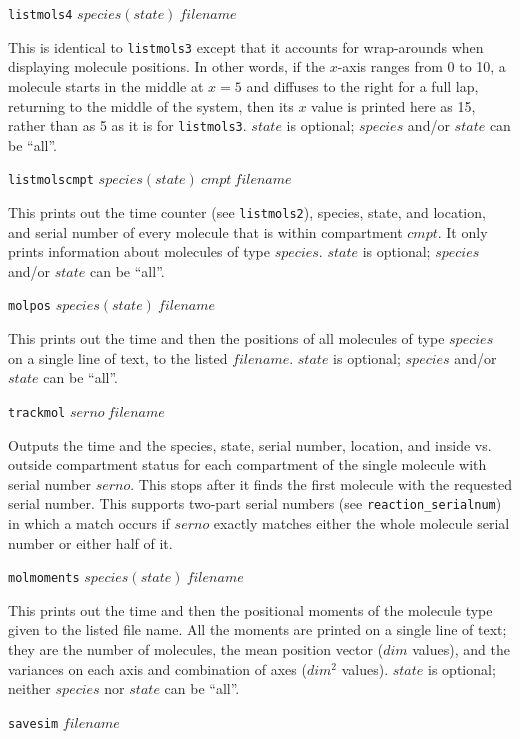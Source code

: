 \documentclass {scrbook}
\newcommand {\ttt} {\texttt}
\begin{document}
\begin{description}
\item{\ttt{listmols4} $species(state)\ filename$}

This is identical to \ttt{listmols3} except that it accounts for wrap-arounds when displaying molecule positions. In other words, if the $x$-axis ranges from 0 to 10, a molecule starts in the middle at $x = 5$ and diffuses to the right for a full lap, returning to the middle of the system, then its $x$ value is printed here as 15, rather than as 5 as it is for \ttt{listmols3}. $state$ is optional; $species$ and/or $state$ can be ``all''.

\item{\ttt{listmolscmpt} $species(state)\ cmpt\ filename$}

This prints out the time counter (see \ttt{listmols2}), species, state, and location, and serial number of every molecule that is within compartment $cmpt$. It only prints information about molecules of type $species$. $state$ is optional; $species$ and/or $state$ can be ``all''.

\item{\ttt{molpos} $species(state)\ filename$}

This prints out the time and then the positions of all molecules of type $species$ on a single line of text, to the listed $filename$. $state$ is optional; $species$ and/or $state$ can be ``all''.

\item{\ttt{trackmol} $serno\ filename$}

Outputs the time and the species, state, serial number, location, and inside vs. outside compartment status for each compartment of the single molecule with serial number $serno$. This stops after it finds the first molecule with the requested serial number. This supports two-part serial numbers (see \ttt{reaction\_serialnum}) in which a match occurs if $serno$ exactly matches either the whole molecule serial number or either half of it.

\item{\ttt{molmoments} $species(state)\ filename$}

This prints out the time and then the positional moments of the molecule type given to the listed file name. All the moments are printed on a single line of text; they are the number of molecules, the mean position vector ($dim$ values), and the variances on each axis and combination of axes ($dim^2$ values). $state$ is optional; neither $species$ nor $state$ can be ``all''.

\item{\ttt{savesim} $filename$}


\end{description}
\end{document}
